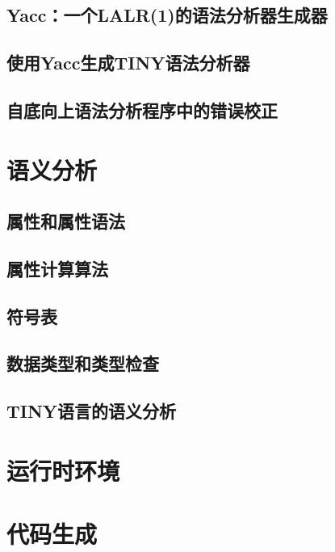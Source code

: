 \documentclass[lang=cn,10pt]{elegantbook}
\begin{document}
\section{Yacc：一个LALR(1)的语法分析器生成器}
\label{sec:5-5}

\section{使用Yacc生成TINY语法分析器}
\label{sec:5-6}

\section{自底向上语法分析程序中的错误校正}
\label{sec:5-7}

\chapter{语义分析}
\label{chap:6}

\section{属性和属性语法}
\label{sec:6-1}

\section{属性计算算法}
\label{sec:6-2}

\section{符号表}
\label{sec:6-3}

\section{数据类型和类型检查}
\label{sec:6-4}

\section{TINY语言的语义分析}
\label{sec:6-5}

\chapter{运行时环境}
\label{chap:7}

\chapter{代码生成}
\label{chap:8}
\end{document}
